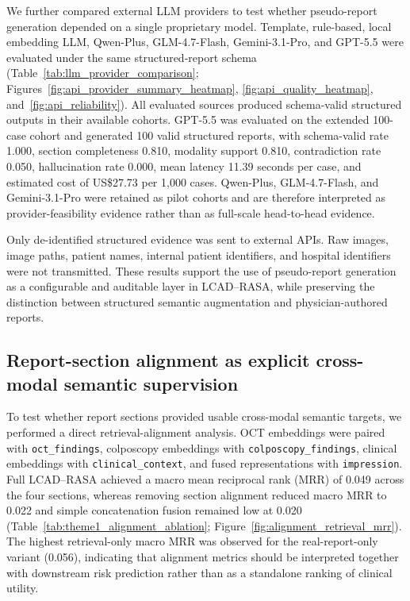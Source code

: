 We further compared external LLM providers to test whether pseudo-report generation depended on a single proprietary model. Template, rule-based, local embedding LLM, Qwen-Plus, GLM-4.7-Flash, Gemini-3.1-Pro, and GPT-5.5 were evaluated under the same structured-report schema (Table~\ref{tab:llm_provider_comparison}; Figures~\ref{fig:api_provider_summary_heatmap}, \ref{fig:api_quality_heatmap}, and~\ref{fig:api_reliability}). All evaluated sources produced schema-valid structured outputs in their available cohorts. GPT-5.5 was evaluated on the extended 100-case cohort and generated 100 valid structured reports, with schema-valid rate 1.000, section completeness 0.810, modality support 0.810, contradiction rate 0.050, hallucination rate 0.000, mean latency 11.39 seconds per case, and estimated cost of US\$27.73 per 1,000 cases. Qwen-Plus, GLM-4.7-Flash, and Gemini-3.1-Pro were retained as pilot cohorts and are therefore interpreted as provider-feasibility evidence rather than as full-scale head-to-head evidence.

Only de-identified structured evidence was sent to external APIs. Raw images, image paths, patient names, internal patient identifiers, and hospital identifiers were not transmitted. These results support the use of pseudo-report generation as a configurable and auditable layer in LCAD--RASA, while preserving the distinction between structured semantic augmentation and physician-authored reports.

\subsection{Report-section alignment as explicit cross-modal semantic supervision}
\label{subsec:alignment_results}

To test whether report sections provided usable cross-modal semantic targets, we performed a direct retrieval-alignment analysis. OCT embeddings were paired with \texttt{oct\_findings}, colposcopy embeddings with \texttt{colposcopy\_findings}, clinical embeddings with \texttt{clinical\_context}, and fused representations with \texttt{impression}. Full LCAD--RASA achieved a macro mean reciprocal rank (MRR) of 0.049 across the four sections, whereas removing section alignment reduced macro MRR to 0.022 and simple concatenation fusion remained low at 0.020 (Table~\ref{tab:theme1_alignment_ablation}; Figure~\ref{fig:alignment_retrieval_mrr}). The highest retrieval-only macro MRR was observed for the real-report-only variant (0.056), indicating that alignment metrics should be interpreted together with downstream risk prediction rather than as a standalone ranking of clinical utility.

